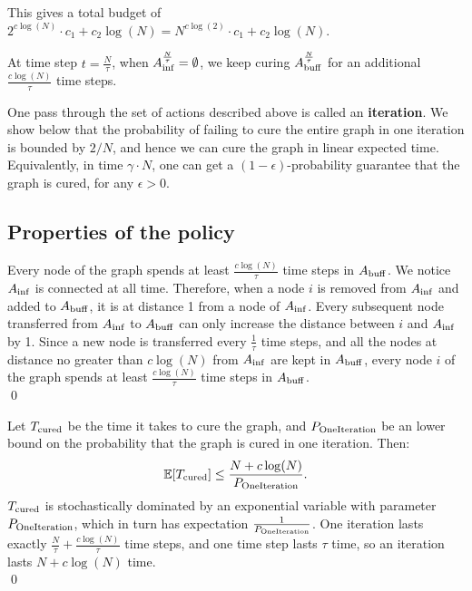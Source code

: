 This gives a total budget of $2^{c\log(N)}\cdot c_1 + c_2\log(N) = N^{c\log(2)} \cdot c_1 + c_2 \log(N)$.

At time step $t=\frac{N}{\tau}$, when $A_{{\rm inf}}^{\frac{N}{\tau}} = \emptyset$, we keep curing $A_{{\rm buff}}^{\frac{N}{\tau}}$ for an additional $\frac{c\log(N)}{\tau}$ time steps. 

One pass through the set of actions described above is called an \textbf{iteration}. We show below that the probability of failing to cure the entire graph in one iteration is bounded by $2/N$, and hence we can cure the graph in linear expected time. Equivalently, in time $\gamma \cdot N$, one can get a $(1-\epsilon)$-probability guarantee that the graph is cured, for any $\epsilon > 0$. 


\subsection{Properties of the policy}
\begin{proposition}{Every node of the graph spends at least $\frac{c\log(N)}{\tau}$ time steps in $A_{{\rm buff}}$.}
\proof We notice $A_{{\rm inf}}$ is connected at all time. Therefore, when a node $i$ is removed from $A_{{\rm inf}}$ and added to $A_{{\rm buff}}$, it is at distance 1 from a node of $A_{{\rm inf}}$. Every subsequent node transferred from $A_{{\rm inf}}$ to $A_{{\rm buff}}$ can only increase the distance between $i$ and $A_{{\rm inf}}$ by 1. Since a new node is transferred every $\frac{1}{\tau}$ time steps, and all the nodes at distance no greater than $c\log(N)$ from $A_{{\rm inf}}$ are kept in $A_{{\rm buff}}$, every node $i$ of the graph spends at least $\frac{c\log(N)}{\tau}$ time steps in $A_{{\rm buff}}$.
\\\qed 
\end{proposition}

\begin{proposition}{Let $T_{{\rm cured}}$ be the time it takes to cure the graph, and $P_{{\rm OneIteration}}$ be an lower bound on the probability that the graph is cured in one iteration. Then:
	$$\mathbb{E}[T_{{\rm cured}}] \leq \frac{N + c\log(N)}{P_{{\rm OneIteration}}}.$$}
\proof $T_{{\rm cured}}$ is stochastically dominated by an exponential variable with parameter $P_{{\rm OneIteration}}$, which in turn has expectation $\frac{1}{P_{{\rm OneIteration}}}$. One iteration lasts exactly $\frac{N}{\tau} + \frac{c\log(N)}{\tau}$ time steps, and one time step lasts $\tau$ time, so an iteration lasts $N + c\log(N)$ time.
\\\qed 
\end{proposition}

